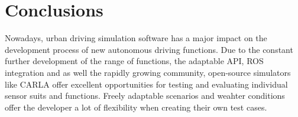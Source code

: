 \section{Conclusions}
	 Nowadays, urban driving simulation software has a major impact on the development process of new autonomous driving functions. Due to the constant further development of the range of functions, the adaptable \ac{API}, \ac{ROS} integration and as well the rapidly growing community, open-source simulators like CARLA offer excellent opportunities for testing and evaluating individual sensor suits and functions. Freely adaptable scenarios and weahter conditions offer the developer a lot of flexibility when creating their own test cases.